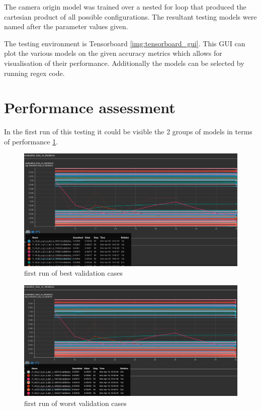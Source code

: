 \documentclass[
    11pt,
    oneside
]{report}
\begin{document}
The camera origin model was trained over a nested for loop that produced the cartesian product of all possible configurations. The resultant testing models were named after the parameter values given.



The testing environment is Tensorboard \ref{img:tensorboard_gui}. This GUI can plot the various models on the given accuracy metrics which allows for visualisation of their performance. Additionally the models can be selected by running regex code.




\section{Performance assessment}



In the first run of this testing it could be visible the 2 groups of models in terms of performance \ref{img:1best_cases}.

\begin{figure}[H]
    \includegraphics[keepaspectratio, width=\columnwidth]{Screenshot_2022-04-20_23-15-30.png}
    \caption{first run of best validation cases}
    \label{img:1best_cases}
\end{figure}

\begin{figure}[H]
    \includegraphics[keepaspectratio, width=\columnwidth]{Screenshot_2022-04-20_23-20-48.png}
    \caption{first run of worst validation cases}
    \label{img:1worst_cases}
\end{figure}
\end{document}
